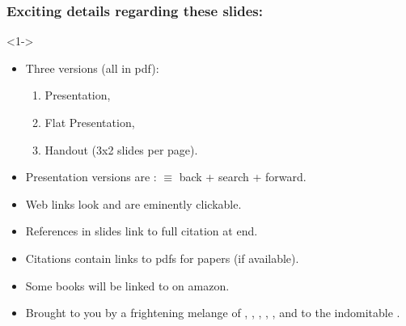 \begin{frame}

  \frametitle{Exciting details regarding these slides:}

  \begin{block}<1->{}
    \begin{itemize}
    \item<+->
      Three versions (all in pdf): 
      \begin{enumerate}
      \item 
        Presentation,
      \item
        Flat Presentation,
      \item
        Handout (3x2 slides per page).
      \end{enumerate}
    \item<+->
      Presentation versions are :\newline
      \insertbackfindforwardnavigationsymbol
      $\equiv$
      back + search + forward.
    \item<+->
      Web links look 
      and are eminently clickable.
    \item<+->
      References in slides link to full citation at end.\cite{anderson1972a}
    \item<+->
      Citations contain links to pdfs for papers (if available).
    \item<+->
      Some books will be linked to on amazon.
    \item<+->
      Brought to you by a frightening melange of 
      , 
      , 
      , 
      ,
      ,
      and 
      to the indomitable .\newline
    \end{itemize}
  \end{block}

\end{frame}

